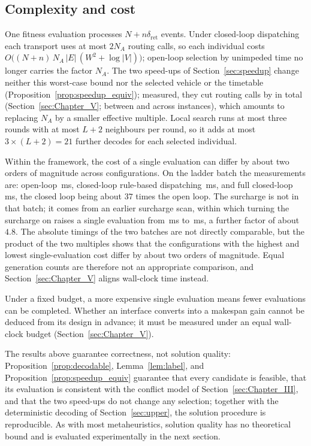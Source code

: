 \subsection{Complexity and cost}

One fitness evaluation processes $N+n\delta_{\mathrm{ret}}$ events. Under closed-loop dispatching each transport uses at most $2N_A$ routing calls, so each individual costs
$O\bigl((N+n)\,N_A\,|E|\,(W^{2}+\log|V|)\bigr)$; open-loop selection by unimpeded time no longer carries the factor $N_A$.
The two speed-ups of Section~\ref{sec:speedup} change neither this worst-case bound nor the selected vehicle or the timetable (Proposition~\ref{prop:speedup_equiv}); measured, they cut routing calls by \RouteCallCut{} in total (Section~\ref{sec:Chapter_V}; between \RouteCallCutLo{} and \RouteCallCutHi{} across instances), which amounts to replacing $N_A$ by a smaller effective multiple.
Local search runs at most three rounds with at most $L+2$ neighbours per round, so it adds at most $3\times(L+2)=21$ further decodes for each selected individual.

Within the framework, the cost of a single evaluation can differ by about two orders of magnitude across configurations. On the ladder batch the measurements are: open-loop \MsOpen{}\,ms, closed-loop rule-based dispatching \MsLoopRule{}\,ms, and full closed-loop \MsLoopProbe{}\,ms, the closed loop being about $37$ times the open loop.
The surcharge is not in that batch; it comes from an earlier surcharge scan, within which turning the surcharge on raises a single evaluation from \MsPricedRef{}\,ms to \MsPriced{}\,ms, a further factor of about $4.8$.
The absolute timings of the two batches are not directly comparable, but the product of the two multiples shows that the configurations with the highest and lowest single-evaluation cost differ by about two orders of magnitude.
Equal generation counts are therefore not an appropriate comparison, and Section~\ref{sec:Chapter_V} aligns wall-clock time instead.

Under a fixed budget, a more expensive single evaluation means fewer evaluations can be completed. Whether an interface converts into a makespan gain cannot be deduced from its design in advance; it must be measured under an equal wall-clock budget (Section~\ref{sec:Chapter_V}).

The results above guarantee correctness, not solution quality: Proposition~\ref{prop:decodable}, Lemma~\ref{lem:label}, and Proposition~\ref{prop:speedup_equiv} guarantee that every candidate is feasible, that its evaluation is consistent with the conflict model of Section~\ref{sec:Chapter_III}, and that the two speed-ups do not change any selection; together with the deterministic decoding of Section~\ref{sec:upper}, the solution procedure is reproducible.
As with most metaheuristics, solution quality has no theoretical bound and is evaluated experimentally in the next section.
